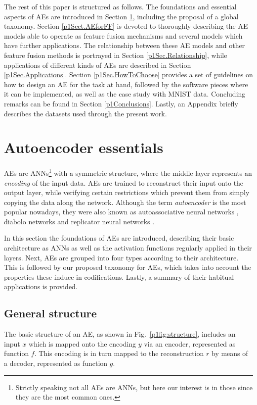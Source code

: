     The rest of this paper is structured as follows. The foundations and essential aspects of AEs are introduced in Section \ref{p1Sec.Essentials}, including the proposal of a global taxonomy. Section \ref{p1Sect.AEforFF} is devoted to thoroughly describing the AE models able to operate as feature fusion mechanisms 
    and several models which have further applications. The relationship between these AE models and other feature fusion methods is portrayed in Section \ref{p1Sec.Relationship}, while applications of different kinds of AEs are described in Section \ref{p1Sec.Applications}. Section \ref{p1Sec.HowToChoose} provides a set of guidelines on how to design an AE for the task at hand, followed by the software pieces where it can be implemented, as well as the case study with MNIST data. Concluding remarks can be found in Section \ref{p1Conclusions}. Lastly, an Appendix briefly describes the datasets used through the present work.

\section{Autoencoder essentials}\label{p1Sec.Essentials} 


AEs are ANNs\footnote{Strictly speaking not all AEs are ANNs, but here our interest is in those since they are the most common ones.} with a symmetric structure, where the middle layer represents an \textit{encoding} of the input data. AEs are trained to reconstruct their input onto the output layer, while verifying certain restrictions which prevent them from simply copying the data along the network. Although the term \textit{autoencoder} is the most popular nowadays, they were also known as autoassociative neural networks , diabolo networks  and replicator neural networks .

In this section the foundations of AEs are introduced, describing their basic architecture as ANNs as well as the activation functions regularly applied in their layers. Next, AEs are grouped into four types according to their architecture. This is followed by our proposed taxonomy for AEs, which takes into account the properties these induce in codifications. Lastly, a summary of their habitual applications is provided.

\subsection{General structure}
The basic structure of an AE, as shown in Fig.~\ref{p1fig:structure}, includes an input $x$ which is mapped onto the encoding $y$ via an encoder, represented as function $f$. This encoding is in turn mapped to the reconstruction $r$ by means of a decoder, represented as function $g$.

